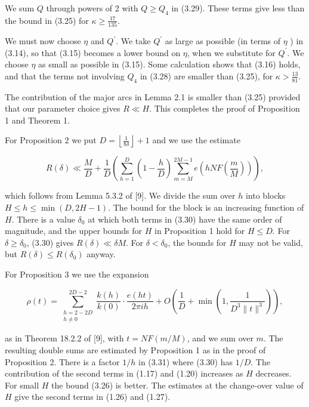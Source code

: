 \documentclass[10pt]{article}
\begin{document}
We sum $Q$ through powers of 2 with $Q \geqslant Q_{4}$ in (3.29). These terms give less than the bound in (3.25) for $\kappa \geqslant \frac{17}{135}$.

We must now choose $\eta$ and $Q^{\prime}$. We take $Q^{\prime}$ as large as possible (in terms of $\eta$ ) in (3.14), so that (3.15) becomes a lower bound on $\eta$, when we substitute for $Q^{\prime}$. We choose $\eta$ as small as possible in (3.15). Some calculation shows that (3.16) holds, and that the terms not involving $Q_{4}$ in (3.28) are smaller than (3.25), for $\kappa>\frac{13}{81}$.

The contribution of the major arcs in Lemma 2.1 is smaller than (3.25) provided that our parameter choice gives $R \ll H$. This completes the proof of Proposition 1 and Theorem 1.

For Proposition 2 we put $D=\left\lfloor\frac{1}{8\delta}\right\rfloor+1$ and we use the estimate


\begin{equation*}
R(\delta) \ll \frac{M}{D}+\frac{1}{D}\left(\sum_{h=1}^{D}\left(1-\frac{h}{D}\right) \sum_{m=M}^{2 M-1} e\left(h N F\left(\frac{m}{M}\right)\right)\right), \tag{3.30}
\end{equation*}


which follows from Lemma 5.3.2 of [9]. We divide the sum over $h$ into blocks $H \leqslant h \leqslant \min (D, 2 H-1)$. The bound for the block is an increasing function of $H$. There is a value $\delta_{0}$ at which both terms in (3.30) have the same order of magnitude, and the upper bounds for $H$ in Proposition 1 hold for $H \leqslant D$. For $\delta \geqslant \delta_{0}$, (3.30) gives $R(\delta) \ll \delta M$. For $\delta<\delta_{0}$, the bounds for $H$ may not be valid, but $R(\delta) \leqslant R\left(\delta_{0}\right)$ anyway.

For Proposition 3 we use the expansion


\begin{equation*}
\rho(t)=\sum_{\substack{h=2-2 D \\ h \neq 0}}^{2 D-2} \frac{k(h)}{k(0)} \cdot \frac{e(h t)}{2 \pi i h}+O\left(\frac{1}{D}+\min \left(1, \frac{1}{D^{3}\|t\|^{3}}\right)\right), \tag{3.31}
\end{equation*}


as in Theorem 18.2.2 of [9], with $t=N F(m / M)$, and we sum over $m$. The resulting double sums are estimated by Proposition 1 as in the proof of Proposition 2. There is a factor $1 / h$ in (3.31) where (3.30) has $1 / D$. The contribution of the second terms in (1.17) and (1.20) increases as $H$ decreases. For small $H$ the bound (3.26) is better. The estimates at the change-over value of $H$ give the second terms in (1.26) and (1.27).
\end{document}
